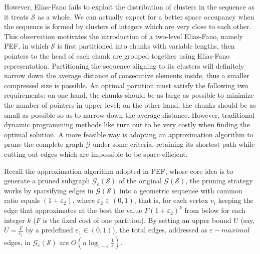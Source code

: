 \documentclass[runningheads,a4paper]{llncs}
\begin{document}
However, Elias-Fano fails to exploit the distribution of clusters in the sequence as it treats $ \mathcal{S} $ as a whole.
We can actually expect for a better space occupancy when the sequence is formed by clusters of integers which are very close to each other.
This observation motivates the introduction of a two-level Elias-Fano, namely PEF, in which $ \mathcal{S} $ is first partitioned into chunks with variable lengths, then pointers to the head of each chunk are grouped together using Elias-Fano representation.
Partitioning the sequence aligning to its clusters will definitely narrow down the average distance of consecutive elements inside, thus a smaller compressed size is possible.
An optimal partition must satisfy the following two requirements: on one hand, the chunks should be as large as possible to minimize the number of pointers in upper level; on the other hand, the chunks should be as small as possible so as to narrow down the average distance.
However, traditional dynamic programming methods like \cite{silvestri2010vsencoding} turn out to be very costly when finding the optimal solution.
A more feasible way is adopting an approximation algorithm to prune the complete graph $ \mathcal{G} $ under some criteria, retaining its shortest path while cutting out edges which are impossible to be space-efficient.

Recall the approximation algorithm adopted in PEF, whose core idea is to generate a pruned subgraph $\mathcal{G}_{\varepsilon}\left(\mathcal{S}\right)$ of the original $\mathcal{G}\left(\mathcal{S}\right)$, the pruning strategy works by sparsifying edges in $\mathcal{G}\left(\mathcal{S}\right)$ into a geometric sequence with common ratio equals $(1+\varepsilon_{2})$, where $ \varepsilon_{2}\in\left(0,1\right) $, that is, for each vertex $v_{i}$ keeping the edge that approximates at the best the value $F\left(1+\varepsilon_{2}\right)^{k}$ from below for each integer $k$ ($F$ is the fixed cost of one partition).
By setting an upper bound $U$ (say, $U=\frac{F}{\varepsilon_{1}}$ by a predefined $\varepsilon_{1}\in\left(0,1\right)$), the total edges, addressed as $\varepsilon-maximal$ edges, in $\mathcal{G}_{\varepsilon}\left(\mathcal{S}\right)$ are $O\left(n\log_{1+\varepsilon}\frac{1}{\varepsilon}\right)$. 
\end{document}
